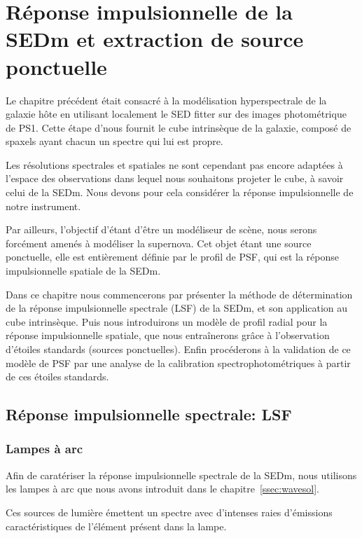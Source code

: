 \documentclass[../main/main.tex]{subfiles}
\begin{document}
\dominitoc
\faketableofcontents
\setcounter{chapter}{5}
\chapter{Réponse impulsionnelle de la SEDm et extraction de source ponctuelle}\label{ch:irf}
\minitoc
\vspace{2cm}
Le chapitre précédent était consacré à la modélisation hyperspectrale de
la galaxie hôte en utilisant localement le SED fitter \cigale sur des
images photométrique de PS1. Cette étape d'\hypergal nous fournit le
cube intrinsèque de la galaxie, composé de spaxels ayant chacun un
spectre qui lui est propre.

Les résolutions spectrales et spatiales ne sont cependant pas encore
adaptées à l'espace des observations dans lequel nous souhaitons projeter
le cube, à savoir celui de la SEDm. Nous devons pour cela considérer la
réponse impulsionnelle de notre instrument.

Par ailleurs, l'objectif d'\hypergal étant d'être un modéliseur de
scène, nous serons forcément amenés à modéliser la supernova. Cet objet
étant une source ponctuelle, elle est entièrement définie par le profil
de PSF, qui est la réponse impulsionnelle spatiale de la SEDm.

Dans ce chapitre nous commencerons par présenter la méthode de
détermination de la réponse impulsionnelle spectrale (LSF) de la SEDm,
et son application au cube intrinsèque. Puis nous introduirons un modèle
de profil radial pour la réponse impulsionnelle spatiale, que nous
entraînerons grâce à l'observation d'étoiles standards (sources
ponctuelles). Enfin procéderons à la validation de ce modèle de PSF par
une analyse de la calibration spectrophotométriques à partir de ces
étoiles standards. 
\newpage

\section{Réponse impulsionnelle spectrale: LSF}

\subsection{Lampes à arc}

Afin de caratériser la réponse impulsionnelle spectrale de la SEDm, nous
utilisons les lampes à arc que nous avons introduit dans le
chapitre~\ref{ssec:wavesol}.

Ces sources de lumière émettent un spectre avec d'intenses raies
d'émissions caractéristiques de l'élément présent dans la lampe.
\end{document}
